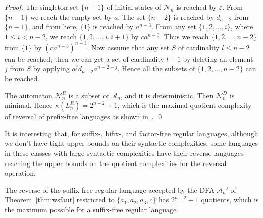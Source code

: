 \documentclass{llncs}
\renewcommand{\le}{\leqslant}
\newcommand{\eps}{\varepsilon}
\newcommand{\cA}{{\mathcal A}}
\newcommand{\cN}{{\mathcal N}}
\begin{document}
\begin{proof}
The singleton set $\{n-1\}$ of initial states  of $\cN_n$ is reached by $\eps$. From $\{n-1\}$ we reach the empty set by $a$. 
The set $\{n-2\}$ is reached by $d_{n-2}$ from $\{n-1\}$, and from here, $\{1\}$ is reached by $a^{n-3}$. From any set $\{1,2,\ldots,i\}$, where $1\le i<n-2$, we reach 
$\{1,2,\ldots,i, i+1\}$ by $ca^{n-3}$. Thus we reach $\{1,2,\ldots,n-2\}$ from $\{1\}$ by
$(ca^{n-3})^{n-3}$.
Now assume that any set $S$ of cardinality $l\le n-2$ can be reached; then we can get a set of cardinality $l-1$ by deleting an element~$j$ from $S$ by applying 
$a^jd_{n-2}a^{n-2-j}$. Hence all the subsets of  $\{1,2,\ldots,n-2\}$ can be reached.

The automaton $\cN_n^R$ is a subset of $\cA_n$, and it is deterministic. Then $\cN_n^D$ is minimal. Hence $\kappa(L_n^R) = 2^{n-2}+1$, which is the maximal quotient complexity of reversal of prefix-free languages as shown in~\cite{HSW09}. \qed
\end{proof} 




\medskip
It is interesting that, for suffix-, bifix-, and factor-free regular languages, although we don't have tight upper bounds on their syntactic complexities, some languages in these classes with large syntactic complexities have their reverse languages reaching the upper bounds on the quotient complexities for the reversal operation. 

\begin{theorem}\label{thm:sfrev}
The reverse of the suffix-free regular language accepted by the DFA $\cA_n'$ of Theorem~\ref{thm:wsfaut} restricted to $\{a_1,a_2,a_3,c\}$ has $2^{n-2}+1$ quotients, which is the maximum possible for a suffix-free regular language. 
\end{theorem}
\end{document}
